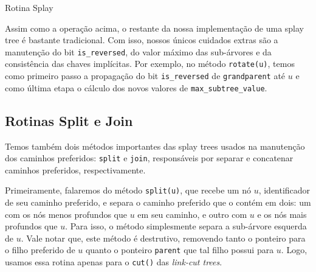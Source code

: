 \begin{algorithm}[h!]
    \caption{Rotina Splay}\label{splay:splay}
    \begin{algorithmic}[1]
         
        \State {}
         
        \Else
         
        \EndIf
        \EndIf
        \EndWhile
        \EndFunction
    \end{algorithmic}
\end{algorithm}

Assim como a operação acima, o restante da nossa implementação de uma splay tree é bastante tradicional. Com isso, nossos únicos cuidados extras são a manutenção do bit \texttt{is\_reversed}, do valor máximo das sub-árvores e da consistência das chaves implícitas. Por exemplo, no método \texttt{rotate(u)}, temos como primeiro passo a propagação do bit \texttt{is\_reversed} de \texttt{grandparent} até $u$ e como última etapa o cálculo dos novos valores de \texttt{max\_subtree\_value}.

\subsection{Rotinas Split e Join}
\label{subsection:lct-splay-split-join}

Temos também dois métodos importantes das splay trees usados na manutenção dos caminhos preferidos: \texttt{split} e \texttt{join}, responsáveis por separar e concatenar caminhos preferidos, respectivamente.

Primeiramente, falaremos do método \texttt{split(u)}, que recebe um nó $u$, identificador de seu caminho preferido, e separa o caminho preferido que o contém em dois: um com os nós menos profundos que $u$ em seu caminho, e outro com $u$ e os nós mais profundos que $u$. Para isso, o método simplesmente separa a sub-árvore esquerda de $u$. Vale notar que, este método é destrutivo, removendo tanto o ponteiro para o filho preferido de $u$ quanto o ponteiro \texttt{parent} que tal filho possui para $u$. Logo, usamos essa rotina apenas para o \texttt{cut()} das \emph{link-cut trees}.

